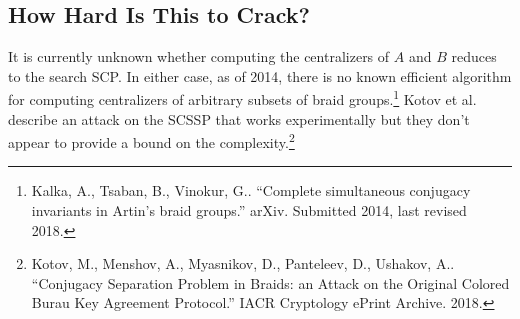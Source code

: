 \documentclass[11pt]{article}
\begin{document}
\subsection*{How Hard Is This to Crack?}
It is currently unknown whether computing the centralizers of $A$ and $B$ reduces to the search SCP. In either case, as of 2014, there is no known efficient algorithm for computing centralizers of arbitrary subsets of braid groups.\footnote{Kalka, A., Tsaban, B., Vinokur, G.. ``Complete simultaneous conjugacy invariants in Artin's braid groups.'' arXiv. Submitted 2014, last revised 2018.} Kotov et al. describe an attack on the SCSSP that works experimentally but they don't appear to provide a bound on the complexity.\footnote{Kotov, M., Menshov, A., Myasnikov, D., Panteleev, D., Ushakov, A.. ``Conjugacy Separation Problem in Braids: an Attack on the Original Colored Burau Key Agreement Protocol.'' IACR Cryptology ePrint Archive. 2018.}
\end{document}
